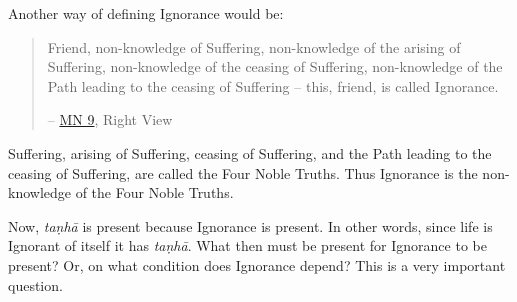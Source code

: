 Another way of defining Ignorance would be:

\begin{quote}
Friend, non-knowledge of Suffering, non-knowledge of the arising of Suffering, non-knowledge of the ceasing of Suffering, non-knowledge of the Path leading to the ceasing of Suffering -- this, friend, is called Ignorance.

 -- \href{https://suttacentral.net/mn9/en/bodhi}{MN 9}, Right View
\end{quote}

Suffering, arising of Suffering, ceasing of Suffering, and the Path leading to the ceasing of Suffering, are called the Four Noble Truths. Thus Ignorance is the non-knowledge of the Four Noble Truths.

Now, \emph{taṇhā} is present because Ignorance is present. In other words, since life is Ignorant of itself it has \emph{taṇhā}. What then must be present for Ignorance to be present? Or, on what condition does Ignorance depend? This is a very important question.

